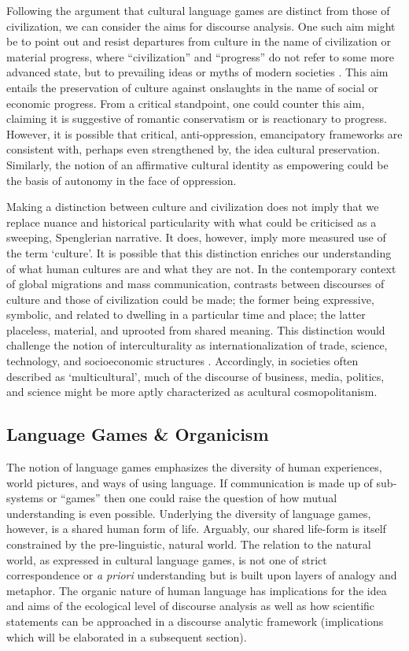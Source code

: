 Following the argument that cultural language games are distinct from those of civilization, we can consider the aims for discourse analysis. One such aim might be to point out and resist departures from culture in the name of civilization or material progress, where ``civilization'' and ``progress'' do not refer to some more advanced state, but to prevailing ideas or myths of modern societies \citep[e.g.][]{Pollard1971a, Bowden2011a}. This aim entails the preservation of culture against onslaughts in the name of social or economic progress. From a critical standpoint, one could counter this aim, claiming it is suggestive of romantic conservatism or is reactionary to progress. However, it is possible that critical, anti-oppression, emancipatory frameworks are consistent with, perhaps even strengthened by, the idea cultural preservation. Similarly, the notion of an affirmative cultural identity as empowering could be the basis of autonomy in the face of oppression. 

Making a distinction between culture and civilization does not imply that we replace nuance and historical particularity with what could be criticised as a sweeping, Spenglerian narrative. It does, however, imply more measured use of the term `culture'. It is possible that this distinction enriches our understanding of what human cultures are and what they are not. In the contemporary context of global migrations and mass communication, contrasts between discourses of culture and those of civilization could be made; the former being expressive, symbolic, and related to dwelling in a particular time and place; the latter placeless, material, and uprooted from shared meaning. This distinction would challenge the notion of interculturality as internationalization of trade, science, technology, and socioeconomic structures \citep[see][5]{Mall2000a}. Accordingly, in societies often described as `multicultural', much of the discourse of business, media, politics, and science might be more aptly characterized as acultural cosmopolitanism. 

\subsection{Language Games \& Organicism}

The notion of language games emphasizes the diversity of human experiences, world pictures, and ways of using language. If communication is made up of sub-systems or ``games'' then one could raise the question of how mutual understanding is even possible. Underlying the diversity of language games, however, is a shared human form of life. Arguably, our shared life-form is itself constrained by the pre-linguistic, natural world. The relation to the natural world, as expressed in cultural language games, is not one of strict correspondence or \textit{a priori} understanding but is built upon layers of analogy and metaphor. The organic nature of human language has implications for the idea and aims of the ecological level of discourse analysis as well as how scientific statements can be approached in a discourse analytic framework (implications which will be elaborated in a subsequent section).

